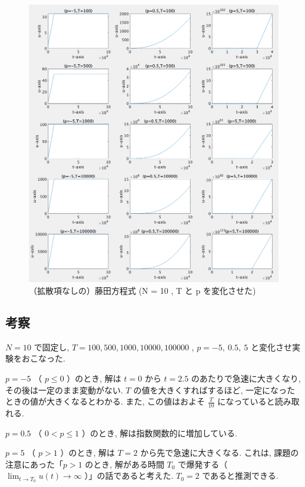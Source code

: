 \documentclass[11pt]{jsarticle}
\begin{document}
\begin{figure}[htbp]
\centering
\includegraphics[width=15cm]{images/d_matlab.png}
\caption{（拡散項なしの）藤田方程式 (N = 10 , T と p を変化させた)}
\end{figure}

\clearpage
\subsection{考察}
$N = 10$ で固定し, $T = 100, 500, 1000, 10000, 100000$ , $p = -5, \ 0.5, \ 5$ と変化させ実験をおこなった.\par
$p = -5$ （ $p\leq 0$ ）のとき, 解は $t = 0$ から $t = 2.5$ のあたりで急速に大きくなり, その後は一定のまま変動がない. $T$ の値を大きくすればするほど, 一定になったときの値が大きくなるとわかる. また, この値はおよそ $\frac{T}{10}$ になっていると読み取れる. \par
$p = 0.5$ （ $0<p\leq1$ ）のとき, 解は指数関数的に増加している. \par
$p = 5$ （ $p>1$ ）のとき, 解は $T = 2$ から先で急速に大きくなる. これは, 課題の注意にあった「$p > 1$ のとき, 解がある時間 $T_{0}$ で爆発する（$ \lim_{t \to T_{0}}u(t) \rightarrow \infty$ ）」の話であると考えた. $T_{0} = 2$ であると推測できる. 
\end{document}
